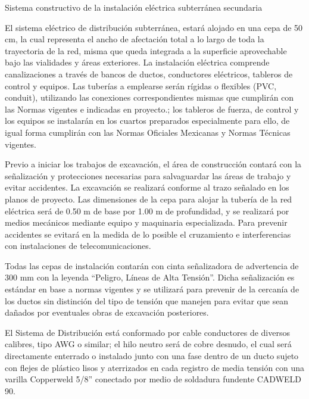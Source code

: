 \documentclass{article}
\begin{document}
\bigskip

Sistema constructivo de la instalación eléctrica subterránea secundaria


\bigskip

El sistema eléctrico de distribución subterránea, estará alojado en una cepa de 50 cm, la cual representa el ancho de afectación total a lo largo de toda la trayectoria de la red, misma que queda integrada a la superficie aprovechable bajo las vialidades y áreas exteriores. La instalación eléctrica comprende canalizaciones a través de bancos de ductos, conductores eléctricos, tableros de control y equipos. Las tuberías a emplearse serán rígidas o flexibles (PVC, conduit), utilizando las conexiones correspondientes mismas que cumplirán con las Normas vigentes e indicadas en proyecto.; los tableros de fuerza, de control y los equipos se instalarán en los cuartos preparados especialmente para ello, de igual forma cumplirán con las Normas Oficiales Mexicanas y Normas Técnicas vigentes. 


\bigskip

Previo a iniciar los trabajos de excavación, el área de construcción contará con la señalización y protecciones necesarias para salvaguardar las áreas de trabajo y evitar accidentes. La excavación se realizará conforme al trazo señalado en los planos de proyecto. Las dimensiones de la cepa para alojar la tubería de la red eléctrica será de 0.50 m de base por 1.00 m de profundidad, y se realizará por medios mecánicos mediante equipo y maquinaria especializada. Para prevenir accidentes se evitará en la medida de lo posible el cruzamiento e interferencias con instalaciones de telecomunicaciones.


\bigskip

Todas las cepas de instalación contarán con cinta señalizadora de advertencia de 300 mm con la leyenda “Peligro, Líneas de Alta Tensión”. Dicha señalización es estándar en base a normas vigentes y se utilizará para prevenir de la cercanía de los ductos sin distinción del tipo de tensión que manejen para evitar que sean dañados por eventuales obras de excavación posteriores.


\bigskip

El Sistema de Distribución está conformado por cable conductores de diversos calibres, tipo AWG o similar; el hilo neutro será de cobre desnudo, el cual será directamente enterrado o instalado junto con una fase dentro de un ducto sujeto con flejes de plástico lisos y aterrizados en cada registro de media tensión con una varilla Copperweld 5/8” conectado por medio de soldadura fundente CADWELD 90.
\end{document}

